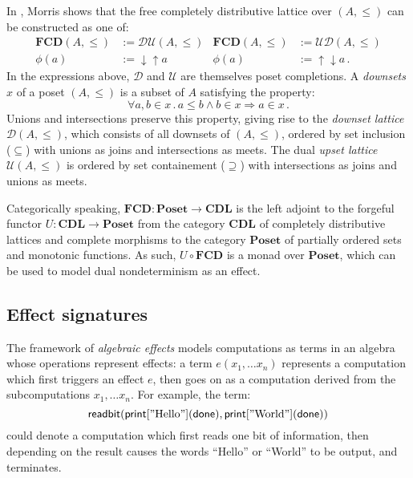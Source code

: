 \documentclass[format=sigplan,authordraft]{acmart}
\newcommand{\kw}[1]{\ensuremath{ \mathsf{#1} }}
\begin{document}
In \cite{augtyp}, Morris shows that
the free completely distributive lattice over $(A, \le)$
can be constructed as one of:
\begin{align*}
  \mathbf{FCD}(A, {\le}) &:= \mathcal{D} \mathcal{U}(A, {\le}) &
  \mathbf{FCD}(A, {\le}) &:= \mathcal{U} \mathcal{D}(A, {\le}) \\
  \phi(a) &:= {\downarrow}{\uparrow} a &
  \phi(a) &:= {\uparrow}{\downarrow} a \,.
\end{align*}
In the expressions above,
$\mathcal{D}$ and $\mathcal{U}$
are themselves poset completions.
A \emph{downsets} $x$ of a poset $(A, {\le})$
is a subset of $A$ satisfying the property:
\[
  \forall a, b \in x \,.\,
          a \le b \wedge b \in x \Rightarrow a \in x \,.
\]
Unions and intersections preserve this property,
giving rise to the \emph{downset lattice} $\mathcal{D}(A, {\le})$,
which consists of all downsets of $(A, {\le})$,
ordered by set inclusion (${\subseteq}$) with
unions as joins and intersections as meets.
The dual \emph{upset lattice} $\mathcal{U}(A, {\le})$
is ordered by set containement (${\supseteq}$) with
intersections as joins and unions as meets.

Categorically speaking,
$\mathbf{FCD} : \mathbf{Poset} \rightarrow \mathbf{CDL}$
is the left adjoint to the forgeful functor
$U : \mathbf{CDL} \rightarrow \mathbf{Poset}$
from the category $\mathbf{CDL}$
of completely distributive lattices and complete morphisms
to the category $\mathbf{Poset}$
of partially ordered sets and monotonic functions.
As such, $U \! \circ \mathbf{FCD}$ is a monad over $\mathbf{Poset}$,
which can be used to model dual nondeterminism
as an effect.



\subsection{Effect signatures} %

The framework of \emph{algebraic effects}
models computations as terms in an algebra
whose operations represent effects:
a term $e(x_1, \ldots x_n)$
represents a computation which first
triggers an effect $e$,
then goes on as a computation derived from
the subcomputations $x_1, \ldots x_n$.
For example,
the term:
\[
    \kw{readbit}(
      \kw{print}["\text{Hello}"](\kw{done}),
      \kw{print}["\text{World}"](\kw{done}))
\]
could denote a computation which
first reads one bit of information,
then depending on the result
causes the words ``Hello'' or ``World'' to be output,
and terminates.
\end{document}
